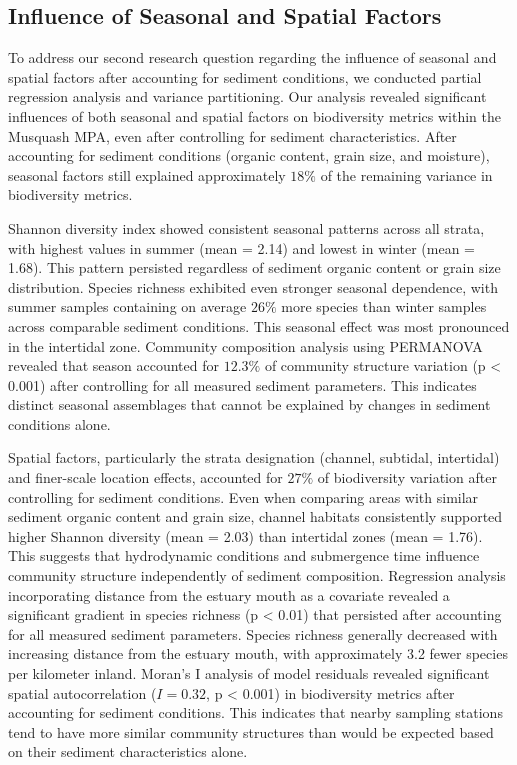 \documentclass[12pt]{article}
\begin{document}
\subsection{Influence of Seasonal and Spatial Factors}

\qquad To address our second research question regarding the influence of
seasonal and spatial factors after accounting for sediment conditions, we
conducted partial regression analysis and variance partitioning. Our analysis
revealed significant influences of both seasonal and spatial factors on
biodiversity metrics within the Musquash MPA, even after controlling for
sediment characteristics. After accounting for sediment conditions (organic
content, grain size, and moisture), seasonal factors still explained
approximately $18\%$ of the remaining variance in biodiversity metrics.

\qquad Shannon diversity index showed consistent seasonal patterns across all
strata, with highest values in summer (mean = 2.14) and lowest in winter (mean =
1.68). This pattern persisted regardless of sediment organic content or grain
size distribution. Species richness exhibited even stronger seasonal dependence,
with summer samples containing on average $26\%$ more species than winter
samples across comparable sediment conditions. This seasonal effect was most
pronounced in the intertidal zone. Community composition analysis using
PERMANOVA revealed that season accounted for $12.3\%$ of community structure
variation (p < 0.001) after controlling for all measured sediment parameters.
This indicates distinct seasonal assemblages that cannot be explained by changes
in sediment conditions alone.

\qquad Spatial factors, particularly the strata designation (channel, subtidal,
intertidal) and finer-scale location effects, accounted for $27\%$ of
biodiversity variation after controlling for sediment conditions. Even when
comparing areas with similar sediment organic content and grain size, channel
habitats consistently supported higher Shannon diversity (mean = 2.03) than
intertidal zones (mean = 1.76). This suggests that hydrodynamic conditions and
submergence time influence community structure independently of sediment
composition. Regression analysis incorporating distance from the estuary mouth
as a covariate revealed a significant gradient in species richness (p < 0.01)
that persisted after accounting for all measured sediment parameters. Species
richness generally decreased with increasing distance from the estuary mouth,
with approximately 3.2 fewer species per kilometer inland. Moran's I analysis of
model residuals revealed significant spatial autocorrelation ($I = 0.32$, p <
0.001) in biodiversity metrics after accounting for sediment conditions. This
indicates that nearby sampling stations tend to have more similar community
structures than would be expected based on their sediment characteristics alone.
\end{document}
